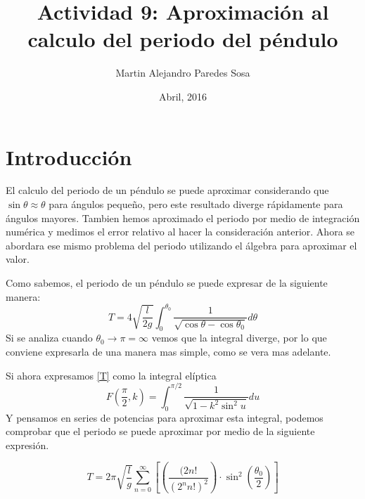 \documentclass[12pt]{article}
\title{Actividad 9: Aproximación al calculo del periodo del péndulo}
\author{Martin Alejandro Paredes Sosa}
\date{Abril, 2016}
\begin{document}
\maketitle
\section{Introducción}
El calculo del periodo de un péndulo se puede aproximar considerando que $\sin\theta \approx \theta$ para ángulos pequeño, pero este resultado diverge rápidamente para ángulos mayores. Tambien hemos aproximado el periodo por medio de integración numérica y medimos el error relativo al hacer la consideración anterior. Ahora se abordara ese mismo problema del periodo utilizando el álgebra para aproximar el valor.

Como sabemos, el periodo de un péndulo se puede expresar de la siguiente manera:
\begin{equation}\label{T}
T = 4 \sqrt{\frac{l}{2g}} \int^{\theta_0}_0 \frac{1}{\sqrt{\cos\theta - \cos\theta_0}} d\theta
\end{equation}
Si se analiza cuando $\theta_0\rightarrow\pi = \infty$  vemos que la integral diverge, por lo que conviene expresarla de una manera mas simple, como se vera mas adelante.

Si ahora expresamos \eqref{T} como la integral elíptica
\begin{equation} \label{Elip}
F \left(\frac{\pi}{2},k \right) = \int^{\pi/2}_0 \frac{1}{\sqrt{1- k^2 \sin^{2}u}} du
\end{equation}
Y pensamos en series de potencias para aproximar esta integral, podemos comprobar que el periodo se puede aproximar por medio de la siguiente expresión.

\begin{equation}\label{Aprox}
T = 2\pi\sqrt{\frac{l}{g}}\sum^\infty_{n=0} \left[   \left(\frac{(2n!}{(2^nn!)^2} \right) \cdot \sin^2\left( \frac{\theta_0}{2}\right)   \right] 
\end{equation}


\pagebreak
\end{document}
